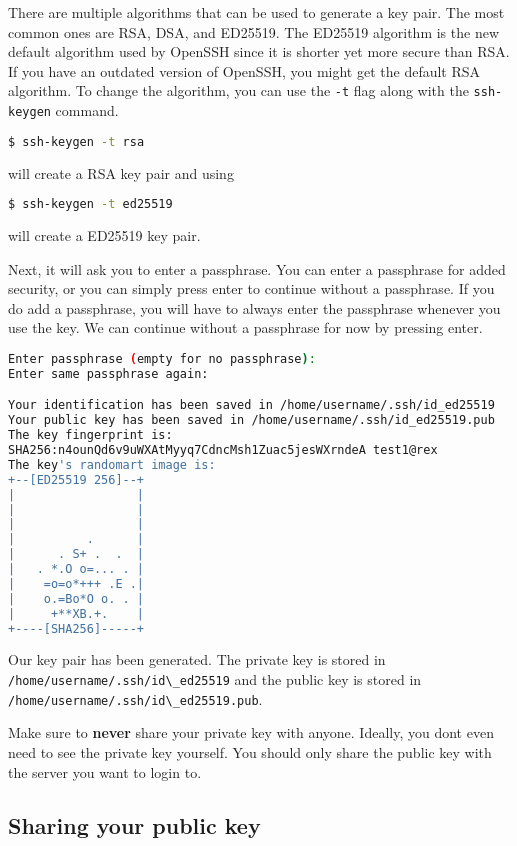 \begin{remark}
  There are multiple algorithms that can be used
  to generate a key pair. The most common ones are
  RSA, DSA, and ED25519. The ED25519 algorithm is
  the new default algorithm used by OpenSSH since
  it is shorter yet more secure than RSA.
  If you have an outdated version of OpenSSH, you
  might get the default RSA algorithm.
  To change the algorithm, you can use the \lstinline|-t|
  flag along with the \lstinline|ssh-keygen| command.
  \begin{lstlisting}[language=bash]
  $ ssh-keygen -t rsa \end{lstlisting}
  will create a RSA key pair and using
  \begin{lstlisting}[language=bash]
  $ ssh-keygen -t ed25519 \end{lstlisting}
  will create a ED25519 key pair.
\end{remark}

Next, it will ask you to enter a passphrase.
You can enter a passphrase for added security,
or you can simply press enter to continue without
a passphrase. If you do add a passphrase, you will
have to always enter the passphrase whenever you
use the key. We can continue without a passphrase
for now by pressing enter.

\begin{lstlisting}[language=bash]
Enter passphrase (empty for no passphrase):
Enter same passphrase again:

Your identification has been saved in /home/username/.ssh/id_ed25519
Your public key has been saved in /home/username/.ssh/id_ed25519.pub
The key fingerprint is:
SHA256:n4ounQd6v9uWXAtMyyq7CdncMsh1Zuac5jesWXrndeA test1@rex
The key's randomart image is:
+--[ED25519 256]--+
|                 |
|                 |
|                 |
|          .      |
|      . S+ .  .  |
|   . *.O o=... . |
|    =o=o*+++ .E .|
|    o.=Bo*O o. . |
|     +**XB.+.    |
+----[SHA256]-----+
\end{lstlisting}

Our key pair has been generated. The private key
is stored in \lstinline|/home/username/.ssh/id\_ed25519|
and the public key is stored in
\lstinline|/home/username/.ssh/id\_ed25519.pub|.

Make sure to \textbf{never} share your private key with anyone.
Ideally, you dont even need to see the private key yourself.
You should only share the public key with the server
you want to login to.

\subsection{Sharing your public key}


